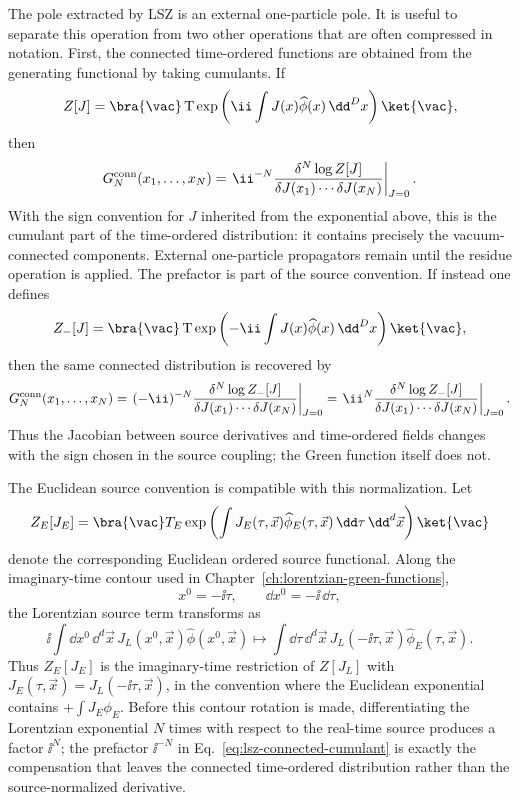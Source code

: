 \begin{definition}
\label{def:lsz-connected-lorentzian-source-convention}
The pole extracted by LSZ is an external one-particle pole.  It is useful to
separate this operation from two other operations that are often compressed
in notation.  First, the connected time-ordered functions are obtained from
the generating functional by taking cumulants.  If
\[
  Z[J]=
  \bra{\vac}
  \operatorname T\exp\left(\ii\int J(x)\widehat\phi(x)\,\dd^Dx\right)
  \ket{\vac},
\]
then
\begin{equation}
  G_N^{\rm conn}(x_1,\ldots,x_N)
  =
  \left.
  \ii^{-N}
  \frac{\delta^N \log Z[J]}
       {\delta J(x_1)\cdots\delta J(x_N)}
  \right|_{J=0}.
  \label{eq:lsz-connected-cumulant}
\end{equation}
With the sign convention for \(J\) inherited from the exponential above, this
is the cumulant part of the time-ordered distribution: it contains precisely
the vacuum-connected components.  External one-particle propagators remain
until the residue operation is applied.
The prefactor is part of the source convention.  If instead one defines
\[
  Z_-[J]=
  \bra{\vac}
  \operatorname T\exp\left(-\ii\int J(x)\widehat\phi(x)\,\dd^Dx\right)
  \ket{\vac},
\]
then the same connected distribution is recovered by
\[
  G_N^{\rm conn}(x_1,\ldots,x_N)
  =
  \left.
  (-\ii)^{-N}
  \frac{\delta^N \log Z_-[J]}
       {\delta J(x_1)\cdots\delta J(x_N)}
  \right|_{J=0}
  =
  \left.
  \ii^{N}
  \frac{\delta^N \log Z_-[J]}
       {\delta J(x_1)\cdots\delta J(x_N)}
  \right|_{J=0}.
\]
Thus the Jacobian between source derivatives and time-ordered fields changes
with the sign chosen in the source coupling; the Green function itself does not.

The Euclidean source convention is compatible with this normalization.  Let
\[
  Z_E[J_E]
  =
  \bra{\vac}
  T_E\exp\left(\int J_E(\tau,\vec x)
    \widehat\phi_E(\tau,\vec x)\,\dd\tau\,\dd^d\vec x\right)
  \ket{\vac}
\]
denote the corresponding Euclidean ordered source functional.  Along the
imaginary-time contour used in Chapter~\ref{ch:lorentzian-green-functions},
\[
  x^0=-\ii\tau,\qquad \dd x^0=-\ii\,\dd\tau,
\]
the Lorentzian source term transforms as
\[
  \ii\int \dd x^0\,\dd^d\vec x\,
    J_L(x^0,\vec x)\widehat\phi(x^0,\vec x)
  \longmapsto
  \int \dd\tau\,\dd^d\vec x\,
    J_L(-\ii\tau,\vec x)\widehat\phi_E(\tau,\vec x).
\]
Thus \(Z_E[J_E]\) is the imaginary-time restriction of \(Z[J_L]\) with
\(J_E(\tau,\vec x)=J_L(-\ii\tau,\vec x)\), in the convention where the
Euclidean exponential contains \(+\int J_E\phi_E\).  Before this contour
rotation is made, differentiating the Lorentzian exponential \(N\) times with
respect to the real-time source produces a factor \(\ii^N\); the prefactor
\(\ii^{-N}\) in Eq.~\eqref{eq:lsz-connected-cumulant} is exactly the
compensation that leaves the connected time-ordered distribution rather than
the source-normalized derivative.
\end{definition}

